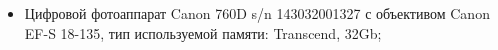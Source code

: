 \begin{itemize}
\item 	
Цифровой фотоаппарат Canon 760D s/n 143032001327 с объективом Canon EF-S 18-135, тип используемой памяти: Transcend,  32Gb;



\end{itemize}
